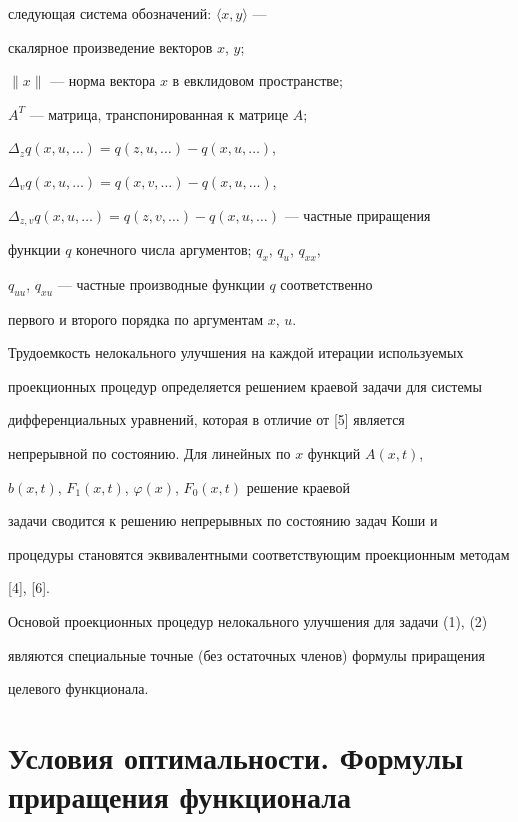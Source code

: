следующая система обозначений: $\langle{x},y\rangle$ ---


скалярное произведение векторов $x$, $y$;


$\|x\|$ --- норма вектора $x$ в евклидовом пространстве;


$A^{T}$ --- матрица, транспонированная к матрице $A$;


$\Delta_{z}q(x,u,\dotsc)=q(z,u,\dotsc)-q(x,u,\dotsc)$,


$\Delta_{v}q(x,u,\dotsc)=q(x,v,\dotsc)-q(x,u,\dotsc)$,


$\Delta_{z,v}q(x,u,\dotsc)=q(z,v,\dotsc)-q(x,u,\dotsc)$ --- частные приращения


функции $q$ конечного числа аргументов; $q_x$, $q_u$, $q_{xx}$,


$q_{uu}$, $q_{xu}$ --- частные производные функции $q$ соответственно


первого и второго порядка по аргументам $x$, $u$.





Трудоемкость нелокального улучшения на каждой итерации используемых


проекционных процедур определяется решением краевой задачи для системы


дифференциальных уравнений, которая в отличие от [5] является


непрерывной по состоянию. Для линейных по $x$ функций $A(x,t)$,


$b(x,t)$, $F_{1}(x,t)$, $\varphi(x)$, $F_{0}(x,t)$ решение краевой


задачи сводится к решению непрерывных по состоянию задач Коши и


процедуры становятся эквивалентными соответствующим проекционным методам


[4], [6].





Основой проекционных процедур нелокального улучшения для задачи (1), (2)


являются специальные точные (без остаточных членов) формулы приращения


целевого функционала.





\section{Условия оптимальности. Формулы приращения функционала}





